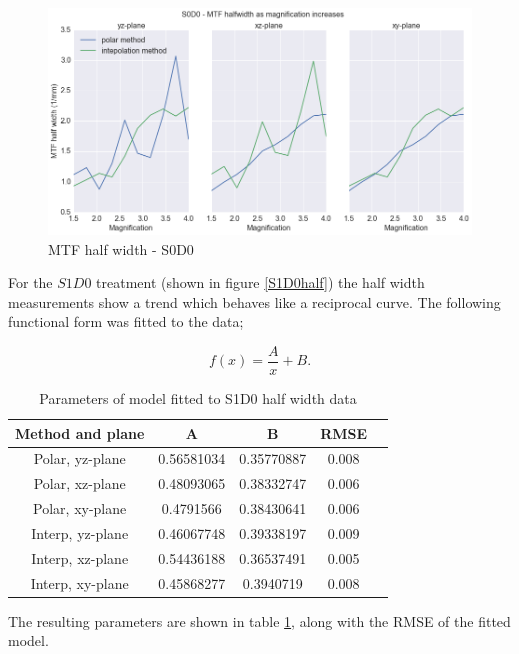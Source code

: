 \documentclass[
  twoside,
  11pt, a4paper,
  footinclude=true,
  headinclude=true,
  cleardoublepage=empty
]{scrbook}
\begin{document}
\begin{figure}[h!]
  \centering
    \includegraphics[width=\textwidth]{code/MTF_and_PSF/MTF_Interp_Polar_Plots_files/MTF_Interp_Polar_Plots_5_1.png}
    \caption{MTF half width - S0D0}
        \label{S0D0half}
\end{figure}

For the $S1D0$ treatment (shown in figure \ref{S1D0half}) the half width measurements show a trend which behaves like a reciprocal curve. The following functional form was fitted to the data;

\[
f(x) = \frac{A}{x} + B.
\]


\begin{table}
\caption{Parameters of model fitted to S1D0 half width data}
\label{loghalffit}
\begin{tabular}{c|cccc}
\toprule
{} Method and plane &     A &     B   & RMSE\\
\midrule
Polar, yz-plane         &  0.56581034  & 0.35770887  & 0.008\\
Polar, xz-plane        &  0.48093065  & 0.38332747  & 0.006\\
Polar, xy-plane      &  0.4791566   & 0.38430641  & 0.006\\
Interp, yz-plane       &   0.46067748 & 0.39338197  & 0.009\\
Interp, xz-plane       &  0.54436188 & 0.36537491  & 0.005\\
Interp, xy-plane       &  0.45868277 &  0.3940719   & 0.008\\
\bottomrule
\end{tabular}
\end{table}

The resulting parameters are shown in table \ref{loghalffit}, along with the RMSE of the fitted model.
\end{document}
